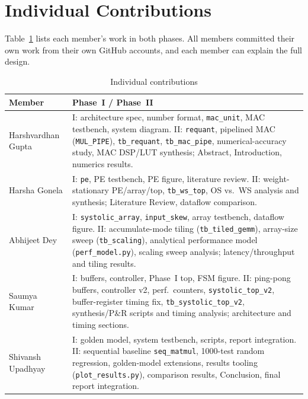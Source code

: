\section{Individual Contributions}
Table~\ref{tab:contrib} lists each member's work in both phases. All
members committed their own work from their own GitHub accounts, and each
member can explain the full design.

\begin{table}[h]
\centering
\caption{Individual contributions}
\label{tab:contrib}
\setlength{\tabcolsep}{2.5pt}
\begin{tabular}{@{}p{1.55cm}p{6.35cm}@{}}
\toprule
\textbf{Member} & \textbf{Phase~I / Phase~II} \\
\midrule
Harshvardhan Gupta & I: architecture spec, number format, \texttt{mac\_unit}, MAC testbench, system diagram.
II: \texttt{requant}, pipelined MAC (\texttt{MUL\_PIPE}), \texttt{tb\_requant}, \texttt{tb\_mac\_pipe}, numerical-accuracy study, MAC DSP/LUT synthesis; Abstract, Introduction, numerics results. \\
Harsha Gonela & I: \texttt{pe}, PE testbench, PE figure, literature review.
II: weight-stationary PE/array/top, \texttt{tb\_ws\_top}, OS vs.\ WS analysis and synthesis; Literature Review, dataflow comparison. \\
Abhijeet Dey & I: \texttt{systolic\_array}, \texttt{input\_skew}, array testbench, dataflow figure.
II: accumulate-mode tiling (\texttt{tb\_tiled\_gemm}), array-size sweep (\texttt{tb\_scaling}), analytical performance model (\texttt{perf\_model.py}), scaling sweep analysis; latency/throughput and tiling results. \\
Saumya Kumar & I: buffers, controller, Phase~I top, FSM figure.
II: ping-pong buffers, controller v2, perf.\ counters, \texttt{systolic\_top\_v2}, buffer-register timing fix, \texttt{tb\_systolic\_top\_v2}, synthesis/P\&R scripts and timing analysis; architecture and timing sections. \\
Shivansh Upadhyay & I: golden model, system testbench, scripts, report integration.
II: sequential baseline \texttt{seq\_matmul}, 1000-test random regression, golden-model extensions, results tooling (\texttt{plot\_results.py}), comparison results, Conclusion, final report integration. \\
\bottomrule
\end{tabular}
\end{table}
